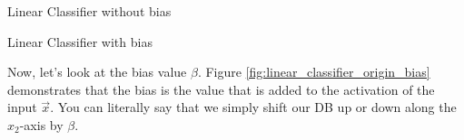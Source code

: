 \begin{minipage}{.45\textwidth}
  \centering
  
  \caption{Linear Classifier without bias}
  \label{fig:linear_classifier_origin}
\end{minipage}
\hfill
\begin{minipage}{.45\textwidth}
  \centering
  
  \caption{Linear Classifier with bias}
  \label{fig:linear_classifier_origin_bias}
\end{minipage}

Now, let's look at the bias value $\beta$. Figure \ref{fig:linear_classifier_origin_bias} demonstrates that the bias is the value that is added to the activation of the input $\vec{x}$.
You can literally say that we simply shift our DB up or down along the $x_2$-axis by $\beta$.



